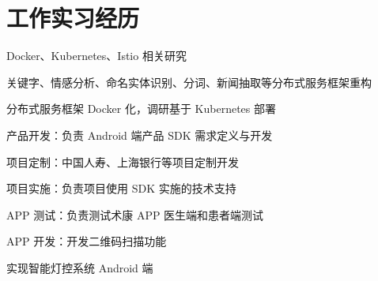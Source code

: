 \documentclass[]{deedy-resume-openfont}
\begin{document}
\hfill
\begin{minipage}[t]{0.68\textwidth}


\section{工作实习经历}

\sectionsep
{}
\vspace{\topsep}
\vspace{\topsep}
\begin{tightemize}
\item Docker、Kubernetes、Istio 相关研究
\item 关键字、情感分析、命名实体识别、分词、新闻抽取等分布式服务框架重构
\item 分布式服务框架 Docker 化，调研基于 Kubernetes 部署
\end{tightemize}
\sectionsep

\sectionsep
{}
\vspace{\topsep}
\vspace{\topsep}
\begin{tightemize}
\item 产品开发：负责 Android 端产品 SDK 需求定义与开发
\item 项目定制：中国人寿、上海银行等项目定制开发
\item 项目实施：负责项目使用 SDK 实施的技术支持
\end{tightemize}
\sectionsep

\sectionsep
{}
\vspace{\topsep}
\begin{tightemize}
\item APP 测试：负责测试术康 APP 医生端和患者端测试
\item APP 开发：开发二维码扫描功能
\end{tightemize}
\sectionsep

\sectionsep
{}
\vspace{\topsep}
\begin{tightemize}
\item 实现智能灯控系统 Android 端
\end{tightemize}
\sectionsep


\end{minipage}
\end{document}
